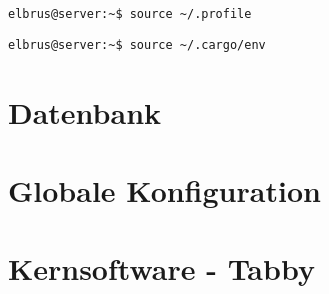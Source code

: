\documentclass{article}
\begin{document}
	\lstset{style=commands}
	\begin{lstlisting}[caption={Laden der Variablen aus dem Terminal Profil.}]
		elbrus@server:~$ source ~/.profile
	\end{lstlisting}

	\lstset{style=commands}
	\begin{lstlisting}[caption={Hinzufügen des Befehls Cargo zu dem Pfad.}]
		elbrus@server:~$ source ~/.cargo/env
	\end{lstlisting}
	\newpage
	
	
	\section{Datenbank}
	
	\newpage
	
	\section{Globale Konfiguration}
	
	\newpage
	
	
	
	
	\section{Kernsoftware - Tabby}
	
	\newpage
	
\end{document}
